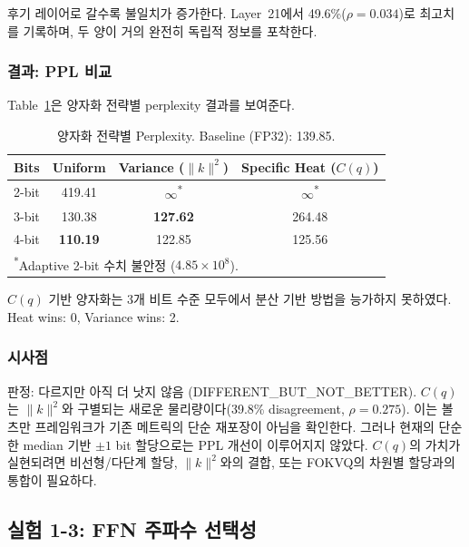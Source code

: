 \documentclass[11pt,a4paper]{article}
\begin{document}
후기 레이어로 갈수록 불일치가 증가한다.
Layer~21에서 49.6\%($\rho = 0.034$)로 최고치를 기록하며, 두 양이 거의 완전히 독립적 정보를 포착한다.

\subsubsection{결과: PPL 비교}

Table~\ref{tab:ppl}은 양자화 전략별 perplexity 결과를 보여준다.

\begin{table}[H]
\centering
\caption{양자화 전략별 Perplexity. Baseline (FP32): 139.85.}
\label{tab:ppl}
\begin{tabular}{lccc}
\toprule
\textbf{Bits} & \textbf{Uniform} & \textbf{Variance ($\|k\|^2$)} & \textbf{Specific Heat ($C(q)$)} \\
\midrule
2-bit & 419.41 & $\infty$\textsuperscript{*} & $\infty$\textsuperscript{*} \\
3-bit & 130.38 & \textbf{127.62} & 264.48 \\
4-bit & \textbf{110.19} & 122.85 & 125.56 \\
\bottomrule
\multicolumn{4}{l}{\footnotesize \textsuperscript{*}Adaptive 2-bit 수치 불안정 ($4.85 \times 10^8$).} \\
\end{tabular}
\end{table}

$C(q)$ 기반 양자화는 3개 비트 수준 모두에서 분산 기반 방법을 능가하지 못하였다.
Heat wins: 0, Variance wins: 2.

\subsubsection{시사점}

판정: \textcolor{partial}{다르지만 아직 더 낫지 않음 (DIFFERENT\_BUT\_NOT\_BETTER)}.
$C(q)$는 $\|k\|^2$와 구별되는 새로운 물리량이다(39.8\% disagreement, $\rho = 0.275$).
이는 볼츠만 프레임워크가 기존 메트릭의 단순 재포장이 아님을 확인한다.
그러나 현재의 단순한 median 기반 $\pm1$ bit 할당으로는 PPL 개선이 이루어지지 않았다.
$C(q)$의 가치가 실현되려면 비선형/다단계 할당, $\|k\|^2$와의 결합, 또는 FOKVQ의 차원별 할당과의 통합이 필요하다.

\subsection{실험 1-3: FFN 주파수 선택성}
\end{document}
